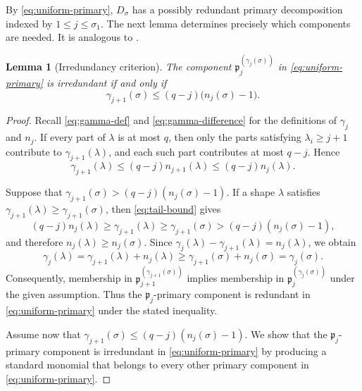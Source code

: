 \documentclass[11pt,reqno]{amsart}
\numberwithin{equation}{subsection}
\newtheorem{lemma}[theorem]{Lemma}
\theoremstyle{definition}
\theoremstyle{remark}
\newcommand{\fp}{\mathfrak p}
\begin{document}
By \eqref{eq:uniform-primary}, $D_\sigma$ has a
possibly redundant primary decomposition indexed by $1\le j\le
\sigma_1$.  The next lemma determines precisely which components are needed.  It is analogous to \cite[Proposition 1.4]{DEP}.

\begin{lemma}[Irredundancy criterion]\label{lem:irredundancy}
The component $\fp_j^{(\gamma_j(\sigma))}$ in
\eqref{eq:uniform-primary} is irredundant if and only if
\begin{equation}\label{eq:irredundancy}
 \gamma_{j+1}(\sigma)
 \le(q-j)\bigl(n_j(\sigma)-1\bigr).
\end{equation}
\end{lemma}

\begin{proof}
Recall \eqref{eq:gamma-def} and \eqref{eq:gamma-difference} for the definitions of $\gamma_j$ and $n_j$.
If every part of $\lambda$ is at most $q$, then only the parts
satisfying $\lambda_i\ge j+1$ contribute to $\gamma_{j+1}(\lambda)$,
and each such part contributes at most $q-j$. Hence
\begin{equation}\label{eq:tail-bound}
\gamma_{j+1}(\lambda)
\leq
(q-j)n_{j+1}(\lambda)
\leq
(q-j)n_j(\lambda).
\end{equation}


Suppose that $\gamma_{j+1}(\sigma)>(q-j)(n_j(\sigma)-1)$. If a shape $\lambda$ satisfies
$\gamma_{j+1}(\lambda)\geq \gamma_{j+1}(\sigma)$,
then \eqref{eq:tail-bound} gives
\[
(q-j)n_j(\lambda)
\geq\gamma_{j+1}(\lambda)
\geq \gamma_{j+1}(\sigma)
>(q-j)(n_j(\sigma)-1),
\]
and therefore $n_j(\lambda)\geq n_j(\sigma)$.
Since $\gamma_j(\lambda)-\gamma_{j+1}(\lambda)=n_j(\lambda)$, we obtain
\[
\gamma_j(\lambda)
=
\gamma_{j+1}(\lambda)+n_j(\lambda)
\geq \gamma_{j+1}(\sigma) +n_j(\sigma)
=
\gamma_j(\sigma).
\]
Consequently, membership in  $\fp_{j+1}^{(\gamma_{j+1}(\sigma))}$ implies membership in $\fp_{j}^{(\gamma_{j}(\sigma))}$ under the  given assumption. 
Thus the $\fp_{j}$-primary component is redundant in \eqref{eq:uniform-primary}  under the stated
inequality.


Assume now that $\gamma_{j+1}(\sigma)\le(q-j)(n_j(\sigma)-1)$. We show that the $\fp_{j}$-primary component is irredundant in \eqref{eq:uniform-primary} by producing a standard monomial that belongs to every other primary component in \eqref{eq:uniform-primary}.


\end{proof}
\end{document}

